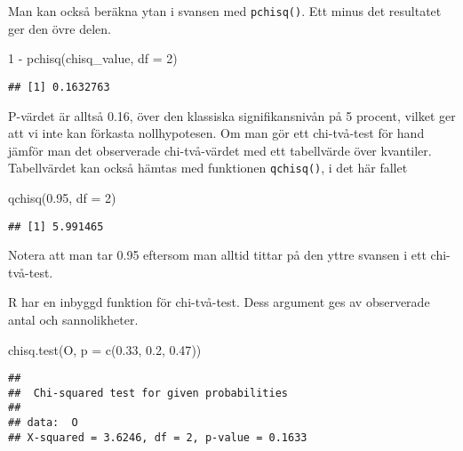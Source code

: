 \documentclass[
]{book}
\newenvironment{Shaded}{\begin{snugshade}}{\end{snugshade}}
\newcommand{\AttributeTok}[1]{\textcolor[rgb]{0.77,0.63,0.00}{#1}}
\newcommand{\DecValTok}[1]{\textcolor[rgb]{0.00,0.00,0.81}{#1}}
\newcommand{\FloatTok}[1]{\textcolor[rgb]{0.00,0.00,0.81}{#1}}
\newcommand{\FunctionTok}[1]{\textcolor[rgb]{0.00,0.00,0.00}{#1}}
\newcommand{\NormalTok}[1]{#1}
\newcommand{\SpecialCharTok}[1]{\textcolor[rgb]{0.00,0.00,0.00}{#1}}
\theoremstyle{definition}
\theoremstyle{definition}
\theoremstyle{definition}
\theoremstyle{definition}
\theoremstyle{remark}
\begin{document}
Man kan också beräkna ytan i svansen med \texttt{pchisq()}. Ett minus det resultatet ger den övre delen.

\begin{Shaded}
\begin{Highlighting}[]
\DecValTok{1} \SpecialCharTok{{-}} \FunctionTok{pchisq}\NormalTok{(chisq\_value, }\AttributeTok{df =} \DecValTok{2}\NormalTok{)}
\end{Highlighting}
\end{Shaded}

\begin{verbatim}
## [1] 0.1632763
\end{verbatim}

P-värdet är alltså 0.16, över den klassiska signifikansnivån på 5 procent, vilket ger att vi inte kan förkasta nollhypotesen. Om man gör ett chi-två-test för hand jämför man det observerade chi-två-värdet med ett tabellvärde över kvantiler. Tabellvärdet kan också hämtas med funktionen \texttt{qchisq()}, i det här fallet

\begin{Shaded}
\begin{Highlighting}[]
\FunctionTok{qchisq}\NormalTok{(}\FloatTok{0.95}\NormalTok{, }\AttributeTok{df =} \DecValTok{2}\NormalTok{)}
\end{Highlighting}
\end{Shaded}

\begin{verbatim}
## [1] 5.991465
\end{verbatim}

Notera att man tar 0.95 eftersom man alltid tittar på den yttre svansen i ett chi-två-test.

R har en inbyggd funktion för chi-två-test. Dess argument ges av observerade antal och sannolikheter.

\begin{Shaded}
\begin{Highlighting}[]
\FunctionTok{chisq.test}\NormalTok{(O, }\AttributeTok{p =} \FunctionTok{c}\NormalTok{(}\FloatTok{0.33}\NormalTok{, }\FloatTok{0.2}\NormalTok{, }\FloatTok{0.47}\NormalTok{))}
\end{Highlighting}
\end{Shaded}

\begin{verbatim}
## 
##  Chi-squared test for given probabilities
## 
## data:  O
## X-squared = 3.6246, df = 2, p-value = 0.1633
\end{verbatim}
\end{document}
